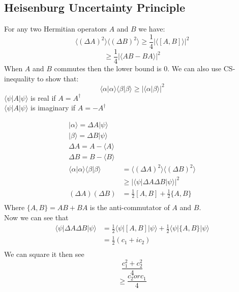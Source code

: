 \documentclass[answers,12pt,addpoints]{exam}
\begin{document}
\subsection{Heisenburg Uncertainty Principle}
For any two Hermitian operators $A$ and $B$ we have:
$$ \langle (\Delta A)^2 \rangle \langle (\Delta B)^2 \rangle \geq \frac{1}{4} | \langle [A,B] \rangle |^2$$
$$ \geq \frac{1}{4} | \langle AB- BA \rangle |^2$$
When $A$ and $B$ commutes then the lower bound is 0.
We can also use CS-inequality to show that:
$$ \langle \alpha | \alpha \rangle \langle \beta | \beta \rangle \geq | \langle \alpha | \beta \rangle |^2$$
$ \langle \psi | A | \psi \rangle $ is real if $A = A^{\dagger}$\\
$ \langle \psi | A | \psi \rangle $ is imaginary if $A = - A^{\dagger}$\\
\begin{example}
    \begin{align*}
        |\alpha \rangle = \Delta A | \psi \rangle \\
        |\beta \rangle = \Delta B | \psi \rangle \\
        \Delta A = A - \langle A \rangle \\
        \Delta B = B - \langle B \rangle \\
        \langle \alpha | \alpha \rangle \langle \beta | \beta \rangle &= \langle (\Delta A)^2 \rangle \langle (\Delta B)^2 \rangle \\
        &\geq | \langle \psi | \Delta A \Delta B | \psi \rangle |^2 \\
        (\Delta A)(\Delta B) &= \frac{1}{2} [A,B] + \frac{1}{2} \{ A,B \} \\
    \end{align*}
    Where $\{ A,B \} = AB + BA$ is the anti-commutator of $A$ and $B$.\\
    Now we can see that 
    \begin{align*}
        \langle \psi | \Delta A \Delta B | \psi \rangle &= \frac{1}{2} \langle \psi | [A,B] | \psi \rangle + \frac{1}{2} \langle \psi | \{ A,B \} | \psi \rangle\\
        &= \frac{1}{2}(c_1 + i c_2 )\\
    \end{align*}
    We can square it then see 
    $$ \frac{c_1^2 + c_2^2}{4}$$
    $$ \geq \frac{c_2 or c_1}{4}$$
\end{example}
\begin{example}
    
\end{example}
\end{document}
